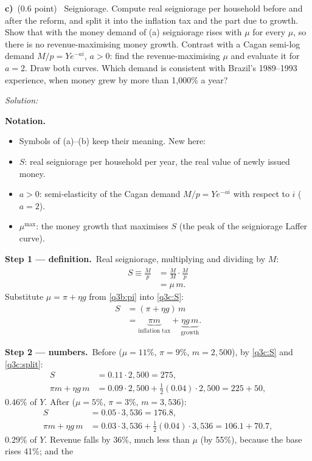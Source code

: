 \documentclass[11pt,a4paper]{article}
\newif\ifsolucoes
\newcommand{\espacoresol}{6cm}
\newcommand{\parte}[2]{\par\Needspace{6\baselineskip}\medskip\noindent\textbf{#1)}~(#2)~}
\newcommand{\resolespaco}{\ifsolucoes\else\par\textit{Solution:}\vspace{\espacoresol}\par\fi}
\newcommand{\passo}[2]{\par\smallskip\noindent\textbf{Step #1.}~#2}
\newenvironment{notacao}{\par\smallskip\noindent\textbf{Notation.}\begin{itemize}[leftmargin=1.4em,topsep=1pt,itemsep=0pt]\small}{\end{itemize}}
\begin{document}
\parte{c}{0.6 point} Seigniorage. Compute real seigniorage per household before and after the reform, and split it
into the inflation tax and the part due to growth. Show that with the money demand of (a) seigniorage rises with
$\mu$ for every $\mu$, so there is no revenue-maximising money growth. Contrast with a Cagan semi-log demand
$M/p=Y e^{-a i}$, $a>0$: find the revenue-maximising $\mu$ and evaluate it for $a=2$. Draw both curves. Which demand
is consistent with Brazil's 1989--1993 experience, when money grew by more than 1{,}000\% a year?
\resolespaco
\begin{sol}
\begin{notacao}
\item Symbols of (a)--(b) keep their meaning. New here:
\item $S$: real seigniorage per household per year, the real value of newly issued money.
\item $a>0$: semi-elasticity of the Cagan demand $M/p=Ye^{-ai}$ with respect to $i$ ($a=2$).
\item $\mu^{\max}$: the money growth that maximises $S$ (the peak of the seigniorage Laffer curve).
\end{notacao}
\passo{1 --- definition}{Real seigniorage, multiplying and dividing by $M$:
\begin{align}
S\equiv\frac{\dot M}{p} &= \frac{\dot M}{M}\cdot\frac{M}{p}\nonumber\\
&= \mu\,m. \label{q3c:S}
\end{align}
Substitute $\mu=\pi+\eta g$ from \eqref{q3b:pi} into \eqref{q3c:S}:
\begin{align}
S &= (\pi+\eta g)\,m\nonumber\\
&= \underbrace{\pi m}_{\text{inflation tax}}+\underbrace{\eta g\,m}_{\text{growth}}. \label{q3c:split}
\end{align}}
\passo{2 --- numbers}{Before ($\mu=11\%$, $\pi=9\%$, $m=2{,}500$), by \eqref{q3c:S} and \eqref{q3c:split}:
\begin{align*}
S &= 0.11\cdot2{,}500=\boxed{275},\\
\pi m+\eta g\,m &= 0.09\cdot2{,}500+\tfrac12(0.04)\cdot2{,}500=225+50,
\end{align*}
$0.46\%$ of $Y$. After ($\mu=5\%$, $\pi=3\%$, $m=3{,}536$):
\begin{align*}
S &= 0.05\cdot3{,}536=\boxed{176.8},\\
\pi m+\eta g\,m &= 0.03\cdot3{,}536+\tfrac12(0.04)\cdot3{,}536=106.1+70.7,
\end{align*}
$0.29\%$ of $Y$. Revenue falls by 36\%, much less than $\mu$ (by 55\%), because the base rises 41\%; and the
}
\end{sol}
\end{document}
